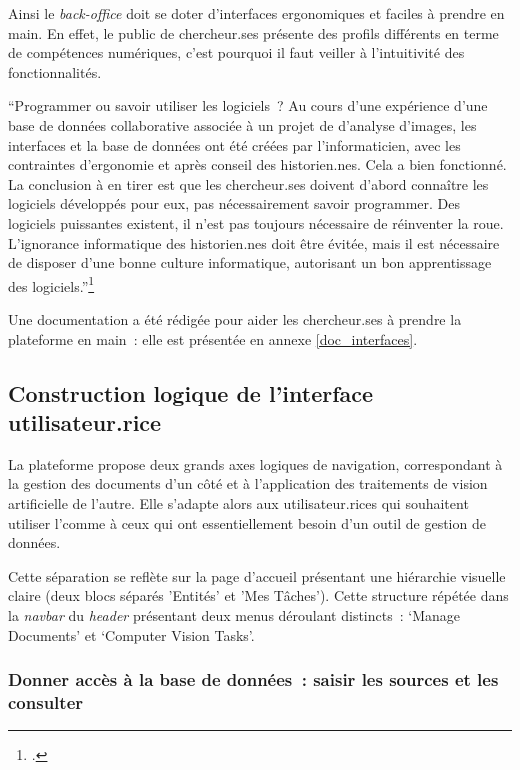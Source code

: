 Ainsi le \textit{back-office} doit se doter d'interfaces ergonomiques et faciles
à prendre en main. En effet, le public de chercheur.ses présente des profils
différents en terme de compétences numériques, c'est pourquoi il faut
veiller à l'intuitivité des
fonctionnalités.

\begin{kwote}
``Programmer ou savoir utiliser les logiciels~? Au cours d'une
expérience d'une base de données collaborative associée à un projet de
d'analyse d'images, les interfaces et la base de données ont été créées
par l'informaticien, avec les contraintes d'ergonomie et après conseil
des historien.nes. Cela a bien fonctionné. La conclusion à en tirer est que
les chercheur.ses doivent d'abord connaître les logiciels développés pour
eux, pas nécessairement savoir programmer. Des logiciels puissantes
existent, il n'est pas toujours nécessaire de réinventer la roue.
L'ignorance informatique des historien.nes doit être évitée, mais il est
nécessaire de disposer d'une bonne culture informatique, autorisant un
bon apprentissage des logiciels.''\footcite[p.35]{clavert_lhistorien_2012}
\end{kwote}

Une documentation a été rédigée pour aider les chercheur.ses à prendre la
plateforme en main~: elle est présentée en annexe \ref{doc_interfaces}.

\hypertarget{construction-logique-de-linterface-utilisateur.rice}{%
\subsection{Construction logique de l'interface
utilisateur.rice}\label{construction-logique-de-linterface-utilisateur.rice}}

La plateforme propose deux grands axes logiques de navigation,
correspondant à la gestion des documents d'un côté et à l'application
des traitements de vision artificielle de l'autre. Elle s'adapte alors
aux utilisateur.rices qui souhaitent utiliser l'\ia comme à ceux qui ont
essentiellement besoin d'un outil de gestion de données.

Cette séparation se reflète sur la page d'accueil présentant une
hiérarchie visuelle claire (deux blocs séparés 'Entités' et 'Mes Tâches').
Cette structure répétée dans la \textit{navbar} du \textit{header} présentant deux menus
déroulant distincts~: `Manage Documents' et `Computer Vision Tasks'.

\hypertarget{donner-acces-a-la-base-de-donnees-saisir-les-sources-et-les-consulter}{%
\subsubsection{Donner accès à la base de données~: saisir les sources et les
consulter}\label{donner-acces-a-la-base-de-donnees-saisir-les-sources-et-les-consulter}}

